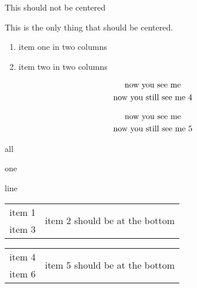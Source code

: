 \documentclass[oneside]{book}
\begin{document}
\begin{minipage}{\linewidth}
This should not be centered

{\centering
This is the only thing that should be centered.\\
}
\end{minipage}

\begin{multicols}{2}
\begin{enumerate}
\item item one in two columns
\item item two in two columns
\end{enumerate}
\end{multicols}


%
\begin{gather*}
\mbox{now you see me}\\
\makebox[1pt]{now you still see me 4}
\end{gather*}

\begin{gather*}
\mbox{now you see me}\\
\makebox[0pt]{now you still see me 5}
\end{gather*}

\parbox{.3\linewidth}{all}%
\parbox{.2\linewidth}{one}%
\parbox{.4\linewidth}{line}

\noindent
\begin{minipage}{.5\linewidth}%
\begin{tabular}{ c c }
item 1 & \multirow{2}{*}{item 2 should be at the bottom} \\
item 3
\end{tabular}
\end{minipage}%

\begin{minipage}{.5\linewidth}%
\begin{tabular}{ c c }
item 4 & \multirow{2}{*}{item 5 should be at the bottom} \\
item 6
\end{tabular}
\end{minipage}

\printindex
\end{document}
